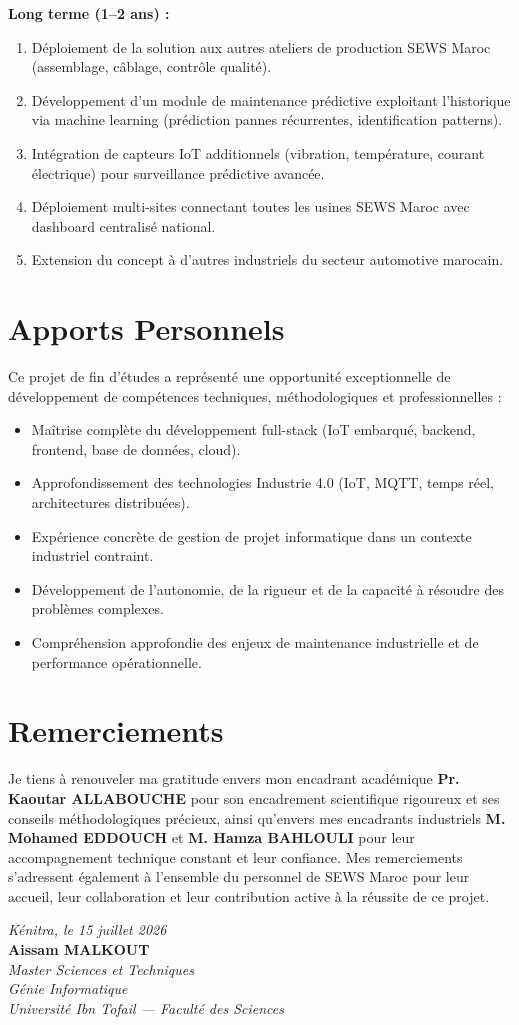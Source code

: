 \textbf{Long terme (1--2 ans) :}
\begin{enumerate}
    \item Déploiement de la solution aux autres ateliers de production SEWS Maroc (assemblage, câblage, contrôle qualité).
    \item Développement d'un module de maintenance prédictive exploitant l'historique via machine learning (prédiction pannes récurrentes, identification patterns).
    \item Intégration de capteurs IoT additionnels (vibration, température, courant électrique) pour surveillance prédictive avancée.
    \item Déploiement multi-sites connectant toutes les usines SEWS Maroc avec dashboard centralisé national.
    \item Extension du concept à d'autres industriels du secteur automotive marocain.
\end{enumerate}

\section*{Apports Personnels}

Ce projet de fin d'études a représenté une opportunité exceptionnelle de développement de compétences techniques, méthodologiques et professionnelles :

\begin{itemize}
    \item Maîtrise complète du développement full-stack (IoT embarqué, backend, frontend, base de données, cloud).
    \item Approfondissement des technologies Industrie 4.0 (IoT, MQTT, temps réel, architectures distribuées).
    \item Expérience concrète de gestion de projet informatique dans un contexte industriel contraint.
    \item Développement de l'autonomie, de la rigueur et de la capacité à résoudre des problèmes complexes.
    \item Compréhension approfondie des enjeux de maintenance industrielle et de performance opérationnelle.
\end{itemize}

\section*{Remerciements}

Je tiens à renouveler ma gratitude envers mon encadrant académique \textbf{Pr. Kaoutar ALLABOUCHE} pour son encadrement scientifique rigoureux et ses conseils méthodologiques précieux, ainsi qu'envers mes encadrants industriels \textbf{M. Mohamed EDDOUCH} et \textbf{M. Hamza BAHLOULI} pour leur accompagnement technique constant et leur confiance. Mes remerciements s'adressent également à l'ensemble du personnel de SEWS Maroc pour leur accueil, leur collaboration et leur contribution active à la réussite de ce projet.

\vspace{1.5cm}
\begin{flushright}
\textit{Kénitra, le 15 juillet 2026}\\[0.5cm]
\textbf{Aissam MALKOUT}\\
\textit{Master Sciences et Techniques}\\
\textit{Génie Informatique}\\
\textit{Université Ibn Tofail --- Faculté des Sciences}
\end{flushright}

\clearpage
